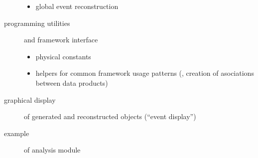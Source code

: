 \begin{description}
\begin{itemize}
         \item global event reconstruction
      \end{itemize}
   \item[programming utilities] and framework interface
      \begin{itemize}
         \item physical constants
         \item helpers for common framework usage patterns (\eg, creation of asociations between data products)
      \end{itemize}
   \item[graphical display] of generated and reconstructed objects (``event display'')
   \item[example] of analysis module
\end{description}
